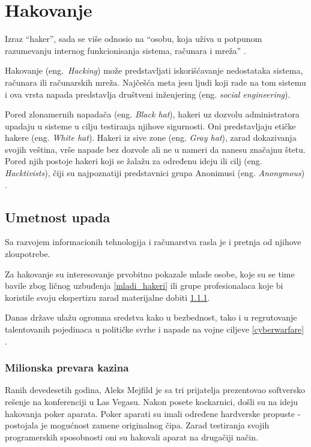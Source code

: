 \documentclass[a4paper]{article}
\begin{document}
\section{Hakovanje}
\label{hakovanje}

Izraz “haker”, sada se više odnosio na “osobu, koja uživa u potpunom razumevanju internog funkcionisanja sistema, računara i mreža” \cite{hacker_definition}.

Hakovanje (eng.~{\em Hacking}) može predstavljati iskorišćavanje nedostataka sistema, računara ili računarskih mreža. Najčešća meta jesu ljudi koji rade na tom sistemu i ova vrsta napada predstavlja društveni inženjering (eng. \textit{social engineering}).

Pored zlonamernih napadača (eng. \textit{Black hat}), hakeri uz dozvolu administratora upadaju u sisteme u cilju testiranja njihove sigurnosti. Oni predstavljaju etičke hakere (eng. \textit{White hat}). Hakeri iz sive zone (eng. \textit{Gray hat}), zarad dokazivanja svojih veština, vrše napade bez dozvole ali ne u nameri da nanesu značajnu štetu. Pored njih postoje hakeri koji se žalažu za određenu ideju ili cilj (eng. \textit{Hacktivists}), čiji su najpoznatiji predstavnici grupa Anonimusi (eng. \textit{Anonymous}) \cite{hackers_hat}.
 
\subsection{Umetnost upada}
\label{sec:intrusion}

Sa razvojem informacionih tehnologija i računarstva rasla je i pretnja od njihove zloupotrebe. 

Za hakovanje su interesovanje prvobitno pokazale mlade osobe, koje su se time bavile zbog ličnog uzbuđenja \ref{mladi_hakeri} ili grupe profesionalaca koje bi koristile svoju ekspertizu zarad materijalne dobiti \ref{milionska_prevara_kazina}.

Danas države ulažu ogromna sredstva kako u bezbednost, tako i u regrutovanje talentovanih pojedinaca u političke svrhe i napade na vojne ciljeve \ref{cyberwarfare} \cite{intrusion}.

\subsubsection{Milionska prevara kazina}
\label{milionska_prevara_kazina}

Ranih devedesetih godina, Aleks Mejfild je sa tri prijatelja prezentovao softversko rešenje na konferenciji u Las Vegasu. Nakon posete kockarnici, došli su na ideju hakovanja poker aparata. Poker aparati su imali određene hardverske propuste - postojala je mogućnost zamene originalnog čipa. Zarad testiranja svojih programerskih sposobnosti oni su hakovali aparat na drugačiji način.
\end{document}
